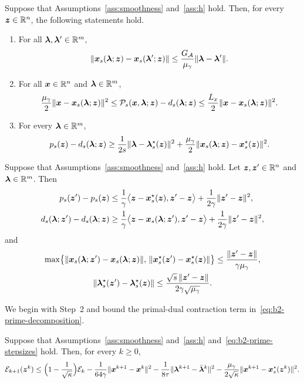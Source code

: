 \begin{lemma}
\label{lem:b2-prime-fixed-center-values}
Suppose that Assumptions~\ref{ass:smoothness} and~\ref{ass:h} hold. Then, for
every \(\bm{z}\in\mathbb{R}^n\), the following statements hold.
\begin{enumerate}[label=(\roman*)]
\item For all \(\bm{\lambda},\bm{\lambda}'\in\mathbb{R}^m\),
\[
    \|\bm{x}_s(\bm{\lambda};\bm{z})-\bm{x}_s(\bm{\lambda}';\bm{z})\|
    \le\frac{G_{\mathcal{A}}}{\mu_\gamma}\|\bm{\lambda}-\bm{\lambda}'\| .
\]
\item For all \(\bm{x}\in\mathbb{R}^n\) and \(\bm{\lambda}\in\mathbb{R}^m\),
\[
    \frac{\mu_\gamma}{2}\|\bm{x}-\bm{x}_s(\bm{\lambda};\bm{z})\|^2
    \le\mathcal P_s(\bm{x},\bm{\lambda};\bm{z})-d_s(\bm{\lambda};\bm{z})
    \le\frac{L_x}{2}\|\bm{x}-\bm{x}_s(\bm{\lambda};\bm{z})\|^2 .
\]
\item For every \(\bm{\lambda}\in\mathbb{R}^m\),
\[
    p_s(\bm{z})-d_s(\bm{\lambda};\bm{z})
    \ge\frac{1}{2s}\|\bm{\lambda}-\bm{\lambda}_s^\star(\bm{z})\|^2
    +\frac{\mu_\gamma}{2}\|\bm{x}_s(\bm{\lambda};\bm{z})-\bm{x}_s^\star(\bm{z})\|^2 .
\]
\end{enumerate}
\end{lemma}

\begin{lemma}
\label{lem:b2-prime-center-dependence}
Suppose that Assumptions~\ref{ass:smoothness} and~\ref{ass:h} hold. Let
\(\bm{z},\bm{z}'\in\mathbb{R}^n\) and \(\bm{\lambda}\in\mathbb{R}^m\). Then
\begin{align*}
    p_s(\bm{z}')-p_s(\bm{z})
    &\le\frac1\gamma\bigl\langle\bm{z}-\bm{x}_s^\star(\bm{z}),\bm{z}'-\bm{z}\bigr\rangle
    +\frac{1}{2\gamma}\|\bm{z}'-\bm{z}\|^2,\\
    d_s(\bm{\lambda};\bm{z}')-d_s(\bm{\lambda};\bm{z})
    &\ge\frac1\gamma\bigl\langle\bm{z}-\bm{x}_s(\bm{\lambda};\bm{z}'),\bm{z}'-\bm{z}\bigr\rangle
    +\frac{1}{2\gamma}\|\bm{z}'-\bm{z}\|^2 ,
\end{align*}
and
\begin{gather*}
    \max\bigl\{\|\bm{x}_s(\bm{\lambda};\bm{z}')-\bm{x}_s(\bm{\lambda};\bm{z})\|,\,
    \|\bm{x}_s^\star(\bm{z}')-\bm{x}_s^\star(\bm{z})\|\bigr\}
    \le\frac{\|\bm{z}'-\bm{z}\|}{\gamma\mu_\gamma},\\
    \|\bm{\lambda}_s^\star(\bm{z}')-\bm{\lambda}_s^\star(\bm{z})\|
    \le\frac{\sqrt{s}\,\|\bm{z}'-\bm{z}\|}{2\gamma\sqrt{\mu_\gamma}} .
\end{gather*}
\end{lemma}

We begin with Step~2 and bound
the primal-dual contraction term in~\eqref{eq:b2-prime-decomposition}.

\begin{lemma}
\label{lem:b2-prime-fixed-center-contraction}
Suppose that Assumptions~\ref{ass:smoothness} and~\ref{ass:h}
and~\eqref{eq:b2-prime-stepsizes} hold. Then, for every \(k\ge0\),
\[
    \mathcal E_{k+1}(\bm{z}^k)
    \le\Bigl(1-\frac{1}{\sqrt{\kappa}}\Bigr)\mathcal E_k
    -\frac{1}{64\gamma}\|\bm{x}^{k+1}-\bm{x}^k\|^2
    -\frac{1}{8\tau}\|\bm{\lambda}^{k+1}-\bar{\bm{\lambda}}^k\|^2
    -\frac{\mu_\gamma}{2\sqrt{\kappa}}\|\bm{x}^{k+1}-\bm{x}_s^\star(\bm{z}^k)\|^2 .
\]
\end{lemma}

